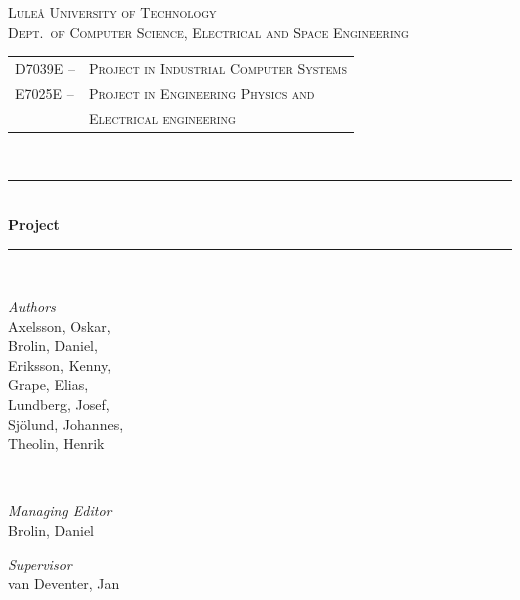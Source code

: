 \newcommand{\HRule}{\rule{\linewidth}{0.5mm}}
\center %


\textsc{\LARGE Luleå University of Technology}\\[1.5cm] %

\textsc{\Large Dept.\ of Computer Science, Electrical and Space Engineering}\\[0.5cm] %

\begin{centering}
\begin{tabular}{l l}
\textsc{\large D7039E --}	& \textsc{\large Project in Industrial Computer Systems}\\ %
\textsc{\large E7025E --}	& \textsc{\large Project in Engineering Physics and}\\
				& \textsc{\large Electrical engineering} %
\end{tabular}
\end{centering}\\[0.5cm]

\HRule\\[0.8cm]

{\huge\bfseries Project \project}\\[0.4cm] %

\HRule\\[1.5cm]

\begin{minipage}{0.4\textwidth}
	\begin{flushleft}
		\large
		\emph{Authors}\\
		Axelsson, Oskar, \\ 
		Brolin, Daniel, \\ 
		Eriksson, Kenny, \\ 
		Grape, Elias, \\ 
		Lundberg, Josef, \\ 
		Sjölund, Johannes, \\
		Theolin, Henrik\\
	\end{flushleft}
\end{minipage}
~
\begin{minipage}{0.4\textwidth}
	\begin{flushright}
		\large
		\textit{Managing Editor}\\
		Brolin, Daniel
	\end{flushright}
	\begin{flushright}
		\large
		\textit{Supervisor}\\
		van Deventer, Jan
	\end{flushright}
\end{minipage}

